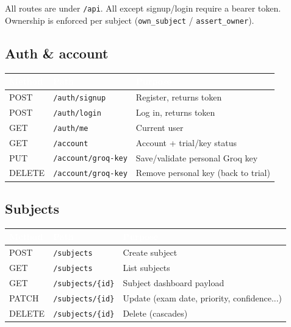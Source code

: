 \documentclass[11pt,a4paper]{article}
\newcommand{\code}[1]{\colorbox{fbCream}{\texttt{\small #1}}}
\newcommand{\hdr}[1]{\textcolor{white}{\bfseries #1}}
\begin{document}
All routes are under \code{/api}. All except signup/login require a bearer token.
Ownership is enforced per subject (\code{own\_subject} / \code{assert\_owner}).

\subsection{Auth \& account}
\begin{tabularx}{\textwidth}{l l L}
\toprule
{}\hdr{Method} & \hdr{Path} & \hdr{Purpose} \\
\midrule
POST   & \code{/auth/signup} & Register, returns token \\
POST   & \code{/auth/login}  & Log in, returns token \\
GET    & \code{/auth/me}     & Current user \\
GET    & \code{/account}     & Account + trial/key status \\
PUT    & \code{/account/groq-key} & Save/validate personal Groq key \\
DELETE & \code{/account/groq-key} & Remove personal key (back to trial) \\
\bottomrule
\end{tabularx}

\subsection{Subjects}
\begin{tabularx}{\textwidth}{l l L}
\toprule
{}\hdr{Method} & \hdr{Path} & \hdr{Purpose} \\
\midrule
POST   & \code{/subjects}       & Create subject \\
GET    & \code{/subjects}       & List subjects \\
GET    & \code{/subjects/\{id\}} & Subject dashboard payload \\
PATCH  & \code{/subjects/\{id\}} & Update (exam date, priority, confidence...) \\
DELETE & \code{/subjects/\{id\}} & Delete (cascades) \\
\bottomrule
\end{tabularx}
\end{document}
